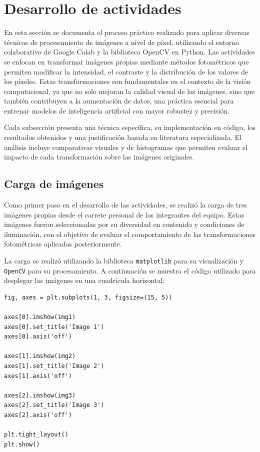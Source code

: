 \documentclass[12pt,letterpaper]{article}
\begin{document}
\newpage

\section{Desarrollo de actividades}

En esta sección se documenta el proceso práctico realizado para aplicar diversas técnicas de procesamiento de imágenes a nivel de píxel, utilizando el entorno colaborativo de Google Colab y la biblioteca OpenCV en Python. Las actividades se enfocan en transformar imágenes propias mediante métodos fotométricos que permiten modificar la intensidad, el contraste y la distribución de los valores de los píxeles. Estas transformaciones son fundamentales en el contexto de la visión computacional, ya que no solo mejoran la calidad visual de las imágenes, sino que también contribuyen a la aumentación de datos, una práctica esencial para entrenar modelos de inteligencia artificial con mayor robustez y precisión.

Cada subsección presenta una técnica específica, su implementación en código, los resultados obtenidos y una justificación basada en literatura especializada. El análisis incluye comparativas visuales y de histogramas que permiten evaluar el impacto de cada transformación sobre las imágenes originales.

\subsection{Carga de imágenes}
Como primer paso en el desarrollo de las actividades, se realizó la carga de tres imágenes propias desde el carrete personal de los integrantes del equipo. Estas imágenes fueron seleccionadas por su diversidad en contenido y condiciones de iluminación, con el objetivo de evaluar el comportamiento de las transformaciones fotométricas aplicadas posteriormente.

La carga se realizó utilizando la biblioteca \texttt{matplotlib} para su visualización y \texttt{OpenCV} para su procesamiento. A continuación se muestra el código utilizado para desplegar las imágenes en una cuadrícula horizontal:

\begin{verbatim}
fig, axes = plt.subplots(1, 3, figsize=(15, 5))

axes[0].imshow(img1)
axes[0].set_title('Image 1')
axes[0].axis('off')

axes[1].imshow(img2)
axes[1].set_title('Image 2')
axes[1].axis('off')

axes[2].imshow(img3)
axes[2].set_title('Image 3')
axes[2].axis('off')

plt.tight_layout()
plt.show()
\end{verbatim}
\end{document}
